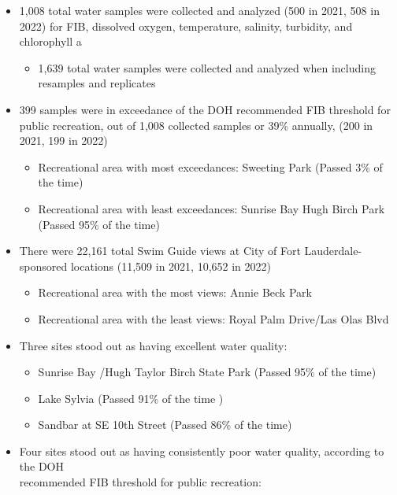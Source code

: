 \documentclass[
]{article}
\providecommand{\tightlist}{%
  \setlength{\itemsep}{0pt}\setlength{\parskip}{0pt}}
\begin{document}
\begin{itemize}
\tightlist
\item
  1,008 total water samples were collected and analyzed (500 in 2021,
  508 in 2022) for FIB, dissolved oxygen, temperature, salinity,
  turbidity, and chlorophyll a

  \begin{itemize}
  \tightlist
  \item
    1,639 total water samples were collected and analyzed when including
    resamples and replicates
  \end{itemize}
\item
  399 samples were in exceedance of the DOH recommended FIB threshold
  for public recreation, out of 1,008 collected samples or 39\%
  annually, (200 in 2021, 199 in 2022)

  \begin{itemize}
  \tightlist
  \item
    Recreational area with most exceedances: Sweeting Park (Passed 3\%
    of the time)\\
  \item
    Recreational area with least exceedances: Sunrise Bay Hugh Birch
    Park (Passed 95\% of the time)
  \end{itemize}
\item
  There were 22,161 total Swim Guide views at City of Fort
  Lauderdale-sponsored locations (11,509 in 2021, 10,652 in 2022)

  \begin{itemize}
  \tightlist
  \item
    Recreational area with the most views: Annie Beck Park\\
  \item
    Recreational area with the least views: Royal Palm Drive/Las Olas
    Blvd
  \end{itemize}
\item
  Three sites stood out as having excellent water quality:

  \begin{itemize}
  \tightlist
  \item
    Sunrise Bay /Hugh Taylor Birch State Park (Passed 95\% of the
    time)\\
  \item
    Lake Sylvia (Passed 91\% of the time )\\
  \item
    Sandbar at SE 10th Street (Passed 86\% of the time)
  \end{itemize}
\item
  Four sites stood out as having consistently poor water quality,
  according to the DOH\\
  recommended FIB threshold for public recreation:


\end{itemize}
\end{document}
